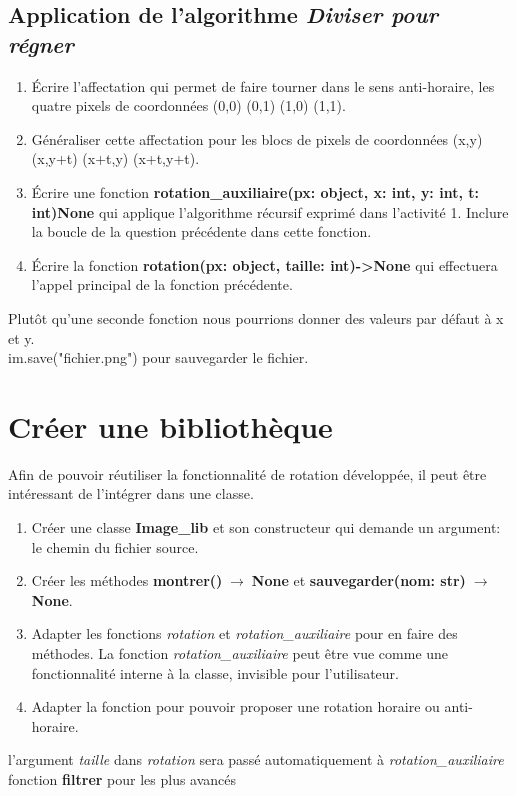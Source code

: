 \documentclass[a4paper,11pt]{article}
\begin{document}
\begin{Form}
\subsection{Application de l'algorithme \emph{Diviser pour régner}}
\begin{activite}
\begin{enumerate}
\item Écrire l'affectation qui permet de faire tourner dans le sens anti-horaire, les quatre pixels de coordonnées (0,0) (0,1) (1,0) (1,1).
\item Généraliser cette affectation pour les blocs de pixels de coordonnées (x,y) (x,y+t) (x+t,y) (x+t,y+t).
\item Écrire une fonction \textbf{rotation\_auxiliaire(px: object, x: int, y: int, t: int)\;\rightarrow\;None} qui applique l'algorithme récursif exprimé dans l'activité 1. Inclure la boucle de la question précédente dans cette fonction.
\item Écrire la fonction \textbf{rotation(px: object, taille: int)->None} qui effectuera l'appel principal de la fonction précédente.
\end{enumerate}
\begin{commentprof}
Plutôt qu'une seconde fonction nous pourrions donner des valeurs par défaut à x et y.\\
im.save("fichier.png") pour sauvegarder le fichier.
\end{commentprof}
\end{activite}
\section{Créer une bibliothèque}
Afin de pouvoir réutiliser la fonctionnalité de rotation développée, il peut être intéressant de l'intégrer dans une classe.
\begin{activite}
\begin{enumerate}
\item Créer une classe \textbf{Image\_lib} et son constructeur qui demande un argument: le chemin du fichier source.
\item Créer les méthodes \textbf{montrer()$\;\rightarrow\;$None} et \textbf{sauvegarder(nom: str)$\;\rightarrow\;$None}.
\item Adapter les fonctions \emph{rotation} et \emph{rotation\_auxiliaire} pour en faire des méthodes. La fonction \emph{rotation\_auxiliaire} peut être vue comme une fonctionnalité interne à la classe, invisible pour l'utilisateur.
\item Adapter la fonction pour pouvoir proposer une rotation horaire ou anti-horaire.
\end{enumerate}
\begin{commentprof}
l'argument \emph{taille} dans \emph{rotation} sera passé automatiquement à \emph{rotation\_auxiliaire}
fonction \textbf{filtrer} pour les plus avancés
\end{commentprof}
\end{activite}
\end{Form}
\end{document}
